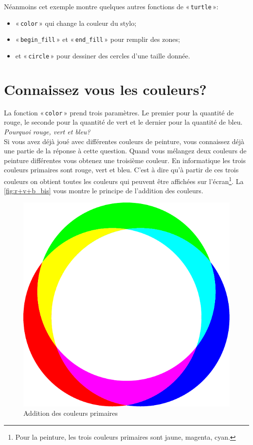 Néanmoins cet exemple montre quelques autres fonctions de « \texttt{turtle} »:
\begin{itemize}
\item « \texttt{color} » qui change la couleur du stylo;
\item « \texttt{begin\_fill} » et « \texttt{end\_fill} » pour remplir des zones;
\item et « \texttt{circle} » pour dessiner des cercles d'une taille donnée.
\end{itemize}


\section{Connaissez vous les couleurs?}

La fonction « \texttt{color} » prend trois paramètres. Le premier pour la quantité de rouge, le seconde pour la quantité de vert et le dernier pour la quantité de bleu.\\

\emph{Pourquoi rouge, vert et bleu?}\\


Si vous avez déjà joué avec différentes couleurs de peinture, vous connaissez déjà une partie de la réponse à cette question. Quand vous mélangez deux couleurs de peinture différentes vous obtenez une troisième couleur. En informatique les trois couleurs primaires sont rouge, vert et bleu. C'est à dire qu'à partir de ces trois couleurs on obtient toutes les couleurs qui peuvent être affichées sur l'écran\footnote{Pour la peinture, les trois couleurs primaires sont jaune, magenta, cyan.}. La \autoref{fig:r+v+b_bis} vous montre le principe de l'addition des couleurs.

\begin{figure}[h!]
\centering
\includegraphics[scale=0.6]{images/r+v+b_bis}
\caption{Addition des couleurs primaires}\label{fig:r+v+b_bis}
\end{figure}

